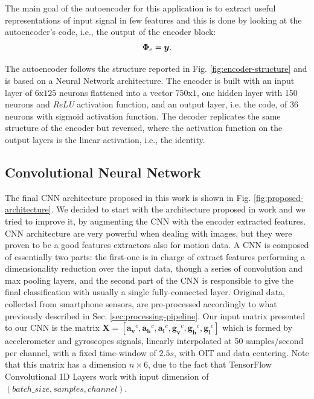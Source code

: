 The main goal of the autoencoder for this application is to extract
useful representations of input signal in few features and this is
done by looking at the autoencoder's code, i.e., the output of the
encoder block:
\begin{equation}
  \boldsymbol{\Phi_{\text{e}}} = \boldsymbol{y}.
\end{equation}



The autoencoder follows the structure reported in
Fig. \ref{fig:encoder-structure} and is based on a Neural Network
architecture. The encoder is built with an input layer of
$6\text{x}125$ neurons flattened into a vector $750\text{x}1$, one hidden
layer with 150 neurons and \textit{ReLU} activation function, and an output
layer, i.e, the code, of $36$ neurons with sigmoid activation
function. The decoder replicates the same structure of the encoder but
reversed, where the activation function on the output layers is the
linear activation, i.e., the identity.

\subsection{Convolutional Neural Network}
\label{subsec:cnn}
The final CNN architecture proposed in this work is shown in Fig. \ref{fig:proposed-architecture}. We decided to start with the architecture proposed in work \cite{ignatov2018real} and we tried to improve it, by augmenting the CNN with the encoder extracted features. CNN architecture are very powerful when dealing with images, but they were proven to be a good features extractors also for motion data. A CNN is composed of essentially two parts: the first-one is in charge of extract features performing a dimensionality reduction over the input data, though a series of convolution and max pooling layers, and the second part of the CNN is responsible to give the final classification with usually a single fully-connected layer. Original data, collected from smartphone sensors, are pre-processed accordingly to what previously described in Sec. \ref{sec:processing-pipeline}. Our input matrix presented to our CNN is the matrix \mbox{$ \boldsymbol{X} = [ \boldsymbol{a_{v}}^{c}, \boldsymbol{a_{h}}^{c}, \boldsymbol{a_{l}}^{c}, \boldsymbol{g_{v}}^{c}, \boldsymbol{g_{h}}^{c}, \boldsymbol{g_{l}}^{c}]$} which is formed by accelerometer and gyroscopes signals, linearly interpolated at 50 samples/second per channel, with a fixed time-window of $2.5s$, with OIT and data centering. Note that this matrix has a dimension $n \times 6$, due to the fact that TensorFlow Convolutional 1D Layers work with input dimension of $(batch\_size, samples, channel)$.

